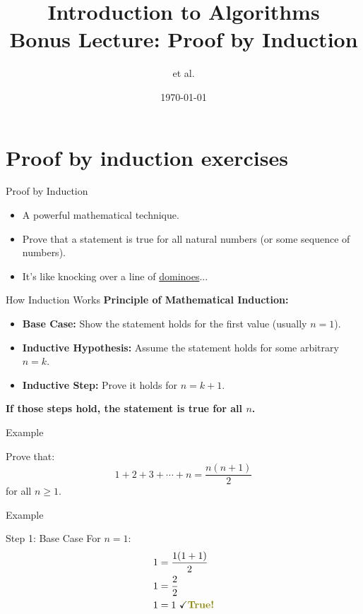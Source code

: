 \documentclass[aspectratio=169]{beamer}
\title[Induction]{Introduction to Algorithms \\ Bonus Lecture: Proof by Induction}
\author{et al.}
\date{\today}
\begin{document}
\frame{\titlepage}

\section{Proof by induction exercises}

\begin{frame}{Proof by Induction}
    \begin{itemize}
        \item A powerful mathematical technique.
        \item Prove that a statement is true for all natural numbers (or some sequence of numbers). \item It's like knocking over a line of \href{https://youtu.be/VMrg-cvhXto?si=Led0jfqiFxl-91Qy}{dominoes}...
    \end{itemize}
\end{frame}

\begin{frame}{How Induction Works}
    \textbf{Principle of Mathematical Induction:}
    \begin{itemize}
        \item \textbf{Base Case:} Show the statement holds for the first value (usually $n = 1$).
        \item \textbf{Inductive Hypothesis:} Assume the statement holds for some arbitrary $n = k$.
        \item \textbf{Inductive Step:} Prove it holds for $n = k+1$.
    \end{itemize}
    \pause
    \textbf{If those steps hold, the statement is true for all $n$.}
\end{frame}

\begin{frame}{Example}
    \begin{exampleblock}{ }
        Prove that:
        $$
            1 + 2 + 3 + \cdots + n = \frac{n(n + 1)}{2}
        $$
        for all $n \geq 1$.
    \end{exampleblock}
\end{frame}

\begin{frame}{Example}
    \begin{exampleblock}{Step 1: Base Case}
        For $n = 1$:
        \begin{equation*}
            \begin{split}
                1 &= \frac{1(1 + 1)}{2} \\
                1 &= \frac{2}{2} \\
                1 &= 1 \text{ \checkmark \textcolor{olive}{\textbf{True!}}}
            \end{split}
        \end{equation*}
    \end{exampleblock}
\end{frame}
\end{document}
